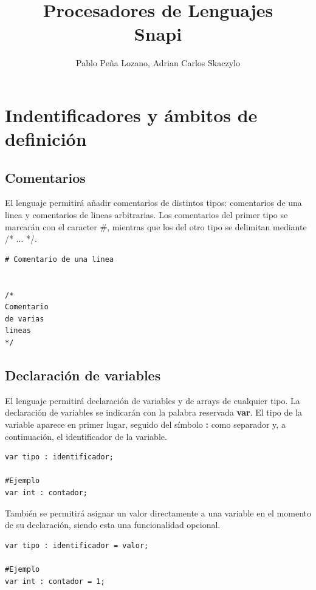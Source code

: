 \documentclass[12pt,a4paper]{article}
\title{\textbf{Procesadores de Lenguajes}\\ \textbf{Snapi}}
\author{Pablo Peña Lozano, Adrian Carlos Skaczylo}
\date{}
\begin{document}
\maketitle
\tableofcontents
\newpage


\section{Indentificadores y ámbitos de definición}

\subsection{Comentarios}

El lenguaje permitirá añadir comentarios de distintos tipos: comentarios de una linea y comentarios de lineas arbitrarias.
Los comentarios del primer tipo se marcarán con el caracter \#, mientras que los del otro tipo  se delimitan mediante  /* ... */.

\begin{lstlisting}
# Comentario de una linea


/*
Comentario 
de varias
lineas
*/
\end{lstlisting}



\subsection{Declaración de variables}
El lenguaje permitirá declaración de variables y de arrays de cualquier tipo. La declaración de variables se indicarán con la palabra reservada \textbf{var}. El tipo de la variable aparece en primer lugar, seguido del símbolo \textbf{:} como separador y, a continuación, el identificador de la variable.

\begin{lstlisting}
var tipo : identificador;

#Ejemplo
var int : contador;
\end{lstlisting}

También se permitirá asignar un valor directamente a una variable en el momento de su declaración, siendo esta una funcionalidad opcional.

\begin{lstlisting}
var tipo : identificador = valor;

#Ejemplo
var int : contador = 1;
\end{lstlisting}
\end{document}
